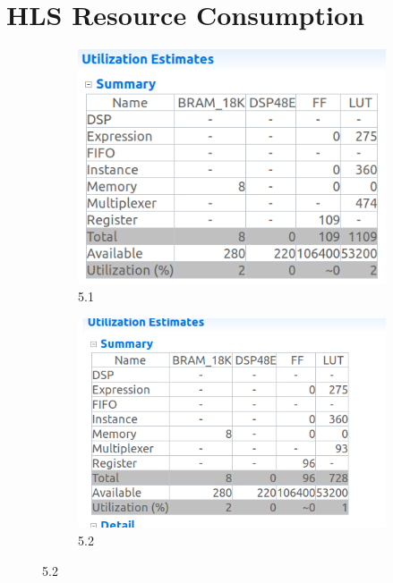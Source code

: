 \documentclass{article}
\begin{document}
\section{HLS Resource Consumption}
\vspace{1cm}
\begin{figure}[h]
\centering
\begin{subfigure}[b]{0.7\textwidth}
    \centering
\includegraphics[width=\textwidth]{figs/31a.png}
    \caption{5.1}
    \label{fig:my_label}
\end{subfigure}
\hfill
\begin{subfigure}[b]{0.8\textwidth}
    \centering
\includegraphics[width=\textwidth]{figs/31b.png}
    \caption{5.2}
    \label{fig:my_label}
\end{subfigure}
\end{figure}
\end{document}
